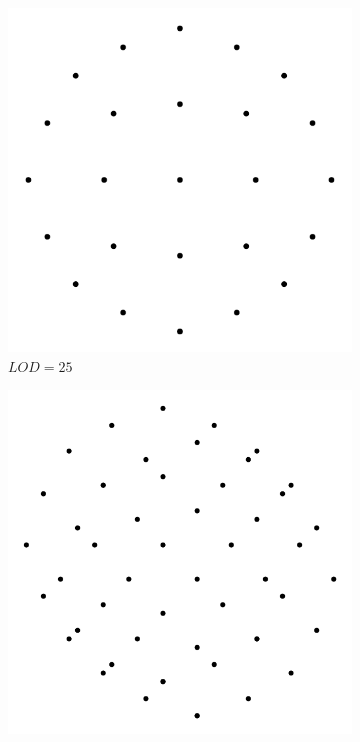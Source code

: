 \begin{figure}[h]
    \centering
    
    \begin{subfigure}{0.2\textwidth}
        \includegraphics[width=\textwidth]{lod-cloud-25.pdf}
        \caption{$LOD = 25$}
    \end{subfigure}
    \begin{subfigure}{0.2\textwidth}
        \includegraphics[width=\textwidth]{lod-cloud-50.pdf}

\end{subfigure}
\end{figure}
